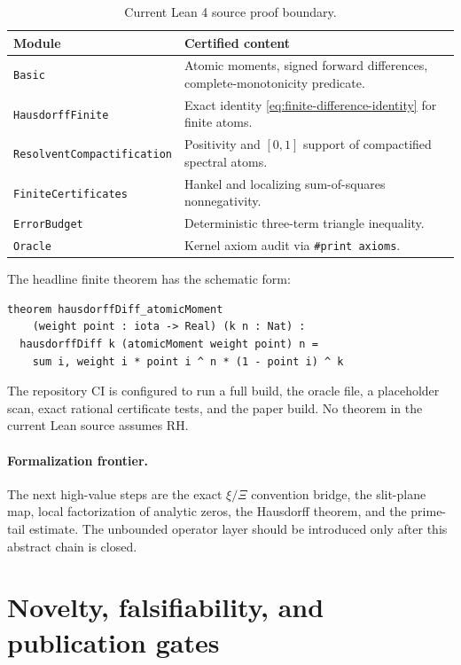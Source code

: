 \documentclass[11pt]{article}
\theoremstyle{definition}
\begin{document}
\begin{table}[ht]
\centering
\small
\begin{tabular}{p{}p{}}
\toprule
Module & Certified content \\
\midrule
\texttt{Basic} & Atomic moments, signed forward differences, complete-monotonicity predicate. \\
\texttt{HausdorffFinite} & Exact identity \eqref{eq:finite-difference-identity} for finite atoms. \\
\texttt{ResolventCompactification} & Positivity and $[0,1]$ support of compactified spectral atoms. \\
\texttt{FiniteCertificates} & Hankel and localizing sum-of-squares nonnegativity. \\
\texttt{ErrorBudget} & Deterministic three-term triangle inequality. \\
\texttt{Oracle} & Kernel axiom audit via \texttt{\#print axioms}. \\
\bottomrule
\end{tabular}
\caption{Current Lean 4 source proof boundary.}
\label{tab:lean}
\end{table}

The headline finite theorem has the schematic form:
\begin{lstlisting}[style=lean,language={}]
theorem hausdorffDiff_atomicMoment
    (weight point : iota -> Real) (k n : Nat) :
  hausdorffDiff k (atomicMoment weight point) n =
    sum i, weight i * point i ^ n * (1 - point i) ^ k
\end{lstlisting}
The repository CI is configured to run a full build, the oracle file, a placeholder scan, exact rational
certificate tests, and the paper build. No theorem in the current Lean source assumes RH.

\paragraph{Formalization frontier.}
The next high-value steps are the exact $\xi/\Xi$ convention bridge, the slit-plane map,
local factorization of analytic zeros, the Hausdorff theorem, and the prime-tail estimate.
The unbounded operator layer should be introduced only after this abstract chain is closed.

\section{Novelty, falsifiability, and publication gates}
\end{document}
